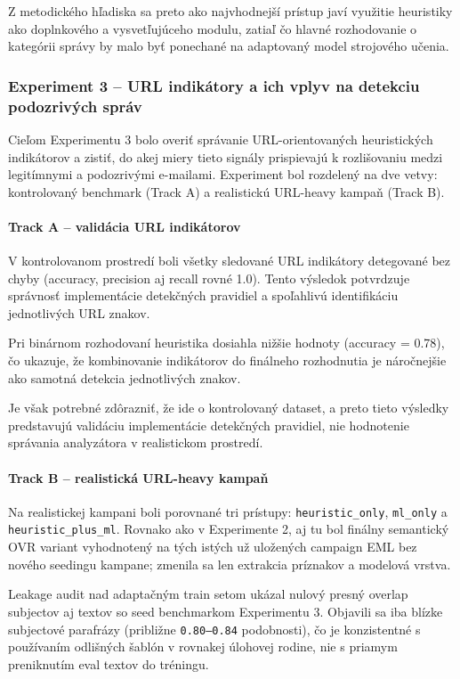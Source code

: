\documentclass[conference]{IEEEtran}
\begin{document}
Z metodického hľadiska sa preto ako najvhodnejší prístup javí využitie heuristiky ako doplnkového a vysvetľujúceho modulu, zatiaľ čo hlavné rozhodovanie o kategórii správy by malo byť ponechané na adaptovaný model strojového učenia.


\subsubsection{Experiment 3 – URL indikátory a ich vplyv na detekciu podozrivých správ}\label{epx3}

Cieľom Experimentu 3 bolo overiť správanie URL-orientovaných heuristických indikátorov a zistiť, do akej miery tieto signály prispievajú k rozlišovaniu medzi legitímnymi a podozrivými e-mailami. Experiment bol rozdelený na dve vetvy: kontrolovaný benchmark (Track A) a realistickú URL-heavy kampaň (Track B).

\paragraph{Track A – validácia URL indikátorov}

V kontrolovanom prostredí boli všetky sledované URL indikátory detegované bez chyby (accuracy, precision aj recall rovné 1.0). Tento výsledok potvrdzuje správnosť implementácie detekčných pravidiel a spoľahlivú identifikáciu jednotlivých URL znakov.

Pri binárnom rozhodovaní heuristika dosiahla nižšie hodnoty (accuracy = 0.78), čo ukazuje, že kombinovanie indikátorov do finálneho rozhodnutia je náročnejšie ako samotná detekcia jednotlivých znakov.

Je však potrebné zdôrazniť, že ide o kontrolovaný dataset, a preto tieto výsledky predstavujú validáciu implementácie detekčných pravidiel, nie hodnotenie správania analyzátora v realistickom prostredí.

\paragraph{Track B – realistická URL-heavy kampaň}

Na realistickej kampani boli porovnané tri prístupy: \texttt{heuristic\_only}, \texttt{ml\_only} a \texttt{heuristic\_plus\_ml}. Rovnako ako v Experimente 2, aj tu bol finálny semantický OVR variant vyhodnotený na tých istých už uložených campaign EML bez nového seedingu kampane; zmenila sa len extrakcia príznakov a modelová vrstva.

Leakage audit nad adaptačným train setom ukázal nulový presný overlap subjectov aj textov so seed benchmarkom Experimentu 3. Objavili sa iba blízke subjectové parafrázy (približne \texttt{0.80--0.84} podobnosti), čo je konzistentné s používaním odlišných šablón v rovnakej úlohovej rodine, nie s priamym preniknutím eval textov do tréningu.
\end{document}
